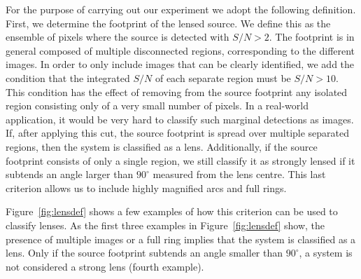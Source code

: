 \documentclass{aa}
\def\Fref#1{Figure~\ref{#1}\xspace}
\def\Eref#1{Equation~\ref{#1}\xspace}
\begin{document}
For the purpose of carrying out our experiment we adopt the following definition. First, we determine the footprint of the lensed source. We define this as the ensemble of pixels where the source is detected with $S/N>2$. The footprint is in general composed of multiple disconnected regions, corresponding to the different images. In order to only include images that can be clearly identified, we add the condition that the integrated $S/N$ of each separate region must be $S/N > 10$. This condition has the effect of removing from the source footprint any isolated region consisting only of a very small number of pixels. In a real-world application, it would be very hard to classify such marginal detections as images.
If, after applying this cut, the source footprint is spread over multiple separated regions, then the system is classified as a lens.
Additionally, if the source footprint consists of only a single region, we still classify it as strongly lensed if it subtends an angle larger than $90^\circ$ measured from the lens centre. This last criterion allows us to include highly magnified arcs and full rings.



\Fref{fig:lensdef} shows a few examples of how this criterion can be used to classify lenses.
As the first three examples in \Fref{fig:lensdef} show, the presence of multiple images or a full ring implies that the system is classified as a lens. Only if the source footprint subtends an angle smaller than $90^\circ$, a system is not considered a strong lens (fourth example).
\end{document}
